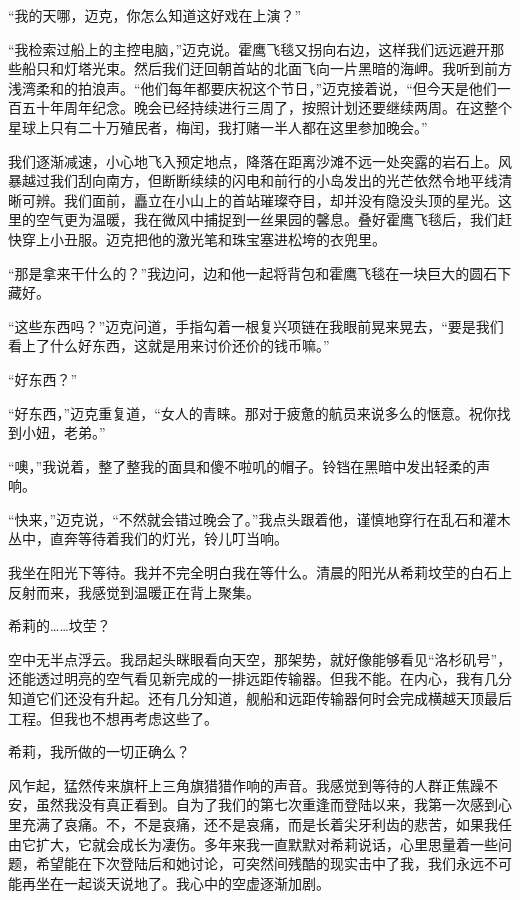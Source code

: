 \documentclass[AutoFakeBold=true]{book}
\begin{document}
``我的天哪，迈克，你怎么知道这好戏在上演？''

``我检索过船上的主控电脑，''迈克说。霍鹰飞毯又拐向右边，这样我们远远避开那些船只和灯塔光束。然后我们迂回朝首站的北面飞向一片黑暗的海岬。我听到前方浅湾柔和的拍浪声。``他们每年都要庆祝这个节日，''迈克接着说，``但今天是他们一百五十年周年纪念。晚会已经持续进行三周了，按照计划还要继续两周。在这整个星球上只有二十万殖民者，梅闰，我打赌一半人都在这里参加晚会。''

我们逐渐减速，小心地飞入预定地点，降落在距离沙滩不远一处突露的岩石上。风暴越过我们刮向南方，但断断续续的闪电和前行的小岛发出的光芒依然令地平线清晰可辨。我们面前，矗立在小山上的首站璀璨夺目，却并没有隐没头顶的星光。这里的空气更为温暖，我在微风中捕捉到一丝果园的馨息。叠好霍鹰飞毯后，我们赶快穿上小丑服。迈克把他的激光笔和珠宝塞进松垮的衣兜里。

``那是拿来干什么的？''我边问，边和他一起将背包和霍鹰飞毯在一块巨大的圆石下藏好。

``这些东西吗？''迈克问道，手指勾着一根复兴项链在我眼前晃来晃去，``要是我们看上了什么好东西，这就是用来讨价还价的钱币嘛。''

``好东西？''

``好东西，''迈克重复道，``女人的青睐。那对于疲惫的航员来说多么的惬意。祝你找到小妞，老弟。''

``噢，''我说着，整了整我的面具和傻不啦叽的帽子。铃铛在黑暗中发出轻柔的声响。

``快来，''迈克说，``不然就会错过晚会了。''我点头跟着他，谨慎地穿行在乱石和灌木丛中，直奔等待着我们的灯光，铃儿叮当响。

\vspace*{1em}

我坐在阳光下等待。我并不完全明白我在等什么。清晨的阳光从希莉坟茔的白石上反射而来，我感觉到温暖正在背上聚集。

{\kaishu 希莉的……}坟茔？

空中无半点浮云。我昂起头眯眼看向天空，那架势，就好像能够看见``洛杉矶号''，还能透过明亮的空气看见新完成的一排远距传输器。但我不能。在内心，我有几分知道它们还没有升起。还有几分知道，舰船和远距传输器何时会完成横越天顶最后工程。但我也不想再考虑这些了。

{\kaishu 希莉，我所做的一切正确么？}

风乍起，猛然传来旗杆上三角旗猎猎作响的声音。我感觉到等待的人群正焦躁不安，虽然我没有真正看到。自为了我们的第七次重逢而登陆以来，我第一次感到心里充满了哀痛。不，不是哀痛，还不是哀痛，而是长着尖牙利齿的悲苦，如果我任由它扩大，它就会成长为凄伤。多年来我一直默默对希莉说话，心里思量着一些问题，希望能在下次登陆后和她讨论，可突然间残酷的现实击中了我，我们永远不可能再坐在一起谈天说地了。我心中的空虚逐渐加剧。
\end{document}
